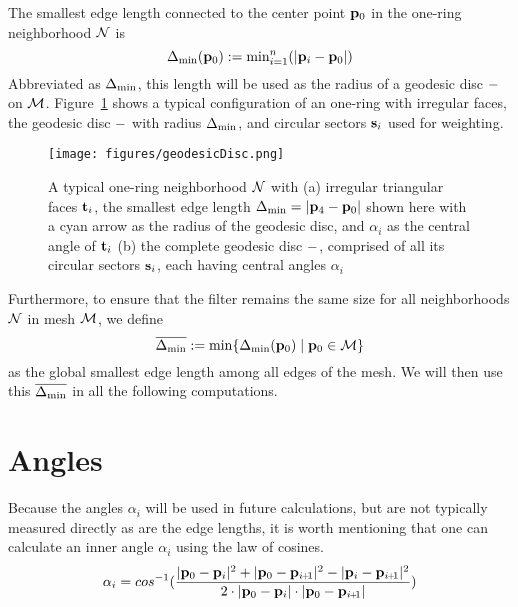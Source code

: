 The smallest edge length connected to the center point $\mathbf{p}_0$ in the one-ring neighborhood $\mathcal{N}$ is
\begin{equation}
	\Delta_\text{min}(\mathbf{p}_0) := \text{min}^n_{i=1} (|\mathbf{p}_i - \mathbf{p}_0|)
	\label{eq:localMinimumEdgeLength}
\end{equation}
Abbreviated as $\Delta_\text{min}$, this length will be used as the radius of a geodesic disc $\mathcal{\Gamma}$ on $\mathcal{M}$. %
%
%
Figure~\ref{fig:geodesicDisc} shows a typical configuration of an one-ring with irregular faces, the geodesic disc $\mathcal{\Gamma}$ with radius $\Delta_\text{min}$, and circular sectors $\mathbf{s}_i$ used for weighting.
\begin{figure}[ht]
\ffigbox
	{\texttt{[image: figures/geodesicDisc.png]}}
	{\caption[One-ring and geodesic disc]{A typical one-ring neighborhood $\mathcal{N}$ with (a) irregular triangular faces $\mathbf{t}_i$, the smallest edge length $\Delta_\text{min} = |\mathbf{p}_4 - \mathbf{p}_0|$ shown here with a cyan arrow as the radius of the geodesic disc, and $\alpha_i$ as the central angle of $\mathbf{t}_i$ (b) the complete geodesic disc $\mathcal{\Gamma}$, comprised of all its circular sectors $\mathbf{s}_i$, each having central angles $\alpha_i$}\label{fig:geodesicDisc}}
\end{figure}%
%
%

Furthermore, to ensure that the filter remains the same size for all neighborhoods $\mathcal{N}$ in mesh $\mathcal{M}$, we define
\begin{equation}
	\overline{\Delta_\text{min}} := \min\{\Delta_\text{min}(\mathbf{p}_0) \;|\; \mathbf{p}_0 \in \mathcal{M}\}
	\label{eq:globalMinimumEdgeLength}
\end{equation}%
%
as the global smallest edge length among all edges of the mesh. We will then use this $\overline{\Delta_\text{min}}$ in all the following computations.
%
\section{Angles}
Because the angles $\alpha_i$ will be used in future calculations, but are not typically measured directly as are the edge lengths, it is worth mentioning that one can calculate an inner angle $\alpha_i$ using the law of cosines. 
\begin{equation}
	\alpha_i = cos^{-1}(\frac{|\bp_0 - \bp_{i}|^2 + |\bp_0 - \bp_{\sipo}|^2 - |\bp_i - \bp_{\sipo}|^2}{2\cdot|\bp_0 - \bp_{i}|\cdot|\bp_0 - \bp_{\sipo}|})
	\label{eq:alphaFromEdgeLengths}
\end{equation}%
%

